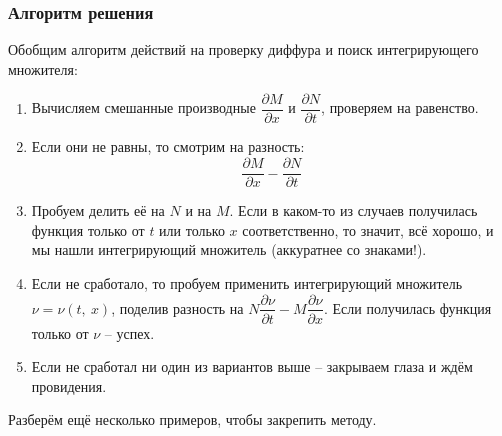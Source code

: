 \documentclass[a4paper,12pt]{article}
\begin{document}
\subsubsection{Алгоритм решения}

Обобщим алгоритм действий на проверку диффура и поиск интегрирующего множителя:
\begin{enumerate}
	\item Вычисляем смешанные производные $\dfrac{\partial M}{\partial x}$ и $\dfrac{\partial N}{\partial t}$, проверяем на равенство.
	\item Если они не равны, то смотрим на разность: 
	\[\dfrac{\partial M}{\partial x} - \dfrac{\partial N}{\partial t}\]
	\item Пробуем делить её на $N$ и на $M$. Если в каком-то из случаев получилась функция только от $t$ или только $x$ соответственно, то значит, всё хорошо, и мы нашли интегрирующий множитель (аккуратнее со знаками!).
	\item Если не сработало, то пробуем применить интегрирующий множитель $\nu = \nu(t,\ x)$, поделив разность на $N \dfrac{\partial\nu}{\partial t} - M\dfrac{\partial \nu}{\partial x}$. Если получилась функция только от $\nu$ -- успех.
	\item Если не сработал ни один из вариантов выше -- закрываем глаза и ждём провидения.
\end{enumerate}

Разберём ещё несколько примеров, чтобы закрепить методу.
\ \\
\end{document}
